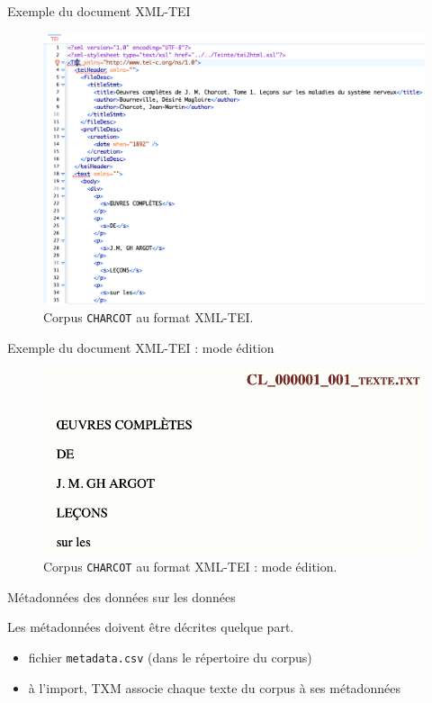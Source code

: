 \documentclass[xetex,xcolor={table,usenames,dvipsnames}]{beamer}
\begin{document}
\begin{frame}{Exemple du document \textsc{XML-TEI}}
		\begin{figure}[h] %
		\centering
		\includegraphics[width=.9\linewidth]{img/charcot_tei.png}
		\caption{Corpus \texttt{CHARCOT} au format \textsc{XML-TEI}.}
		\label{fig:ling_out_TAL}
	\end{figure}
\end{frame}

\begin{frame}{Exemple du document \textsc{XML-TEI} : mode édition}
	\begin{figure}[h] %
		\centering
		\includegraphics[width=1\linewidth]{img/charcot_tei_edition.png}
		\caption{Corpus \texttt{CHARCOT} au format \textsc{XML-TEI} : mode édition.}
		\label{fig:ling_out_TAL}
	\end{figure}
\end{frame}

\begin{frame}{Métadonnées}
	\og{}des données sur les données\fg{}
	
	Les métadonnées doivent être décrites quelque part.
	\begin{itemize}
		\item fichier \texttt{metadata.csv} (dans le répertoire du corpus)
		\item à l'import, \textsc{TXM} associe chaque texte du corpus à ses métadonnées
	\end{itemize}
\end{frame}
\end{document}
